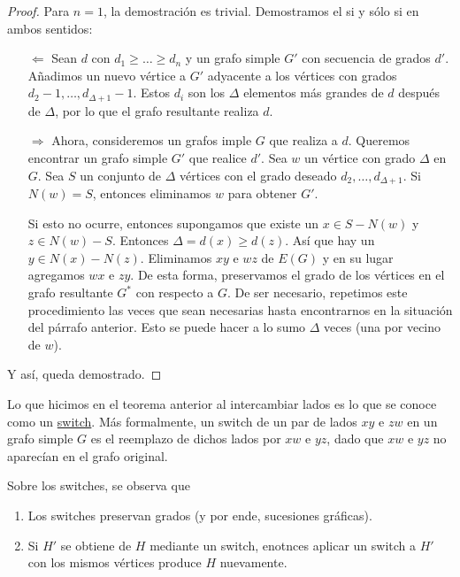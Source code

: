 \begin{proof}
    Para $n=1$, la demostración es trivial. Demostramos el si y sólo si en ambos sentidos:
    
    \begin{enumerate}
        \item[$\Leftarrow$] Sean $d$ con $d_1 \geq \dots \geq d_n$ y un grafo simple $G'$ con secuencia de grados $d'$. Añadimos un nuevo vértice a $G'$ adyacente a los vértices con grados $d_2 - 1, \dots, d_{\Delta+1}-1$. Estos $d_i$ son los $\Delta$ elementos más grandes de $d$ después de $\Delta$, por lo que el grafo resultante realiza $d$.
        
        \item[$\Rightarrow$] Ahora, consideremos un grafos imple $G$ que realiza a $d$. Queremos encontrar un grafo simple $G'$ que realice $d'$. Sea $w$ un vértice con grado $\Delta$ en $G$. Sea $S$ un conjunto de $\Delta$ vértices con el grado deseado $d_2, \dots, d_{\Delta + 1}$. Si $N(w) = S$, entonces eliminamos $w$ para obtener $G'$.
        
        Si esto no ocurre, entonces supongamos que existe un $x \in S - N(w)$ y $z \in N(w) - S$. Entonces $\Delta = d(x) \geq d(z)$. Así que hay un $y \in N(x) - N(z)$. Eliminamos $xy$ e $wz$ de $E(G)$ y en su lugar agregamos $wx$ e $zy$. De esta forma, preservamos el grado de los vértices en el grafo resultante $G^*$ con respecto a $G$. De ser necesario, repetimos este procedimiento las veces que sean necesarias hasta encontrarnos en la situación del párrafo anterior. Esto se puede hacer a lo sumo $\Delta$ veces (una por vecino de $w$).
    \end{enumerate}
    
    Y así, queda demostrado.
\end{proof}

\begin{defn}
    Lo que hicimos en el teorema anterior al intercambiar lados es lo que se conoce como un \ul{switch}. Más formalmente, un switch de un par de lados $xy$ e $zw$ en un grafo simple $G$ es el reemplazo de dichos lados por $xw$ e $yz$, dado que $xw$ e $yz$ no aparecían en el grafo original.
\end{defn}

Sobre los switches, se observa que

\begin{enumerate}
    \item Los switches preservan grados (y por ende, sucesiones gráficas).
    \item Si $H'$ se obtiene de $H$ mediante un switch, enotnces aplicar un switch a $H'$ con los mismos vértices produce $H$ nuevamente.
\end{enumerate}

